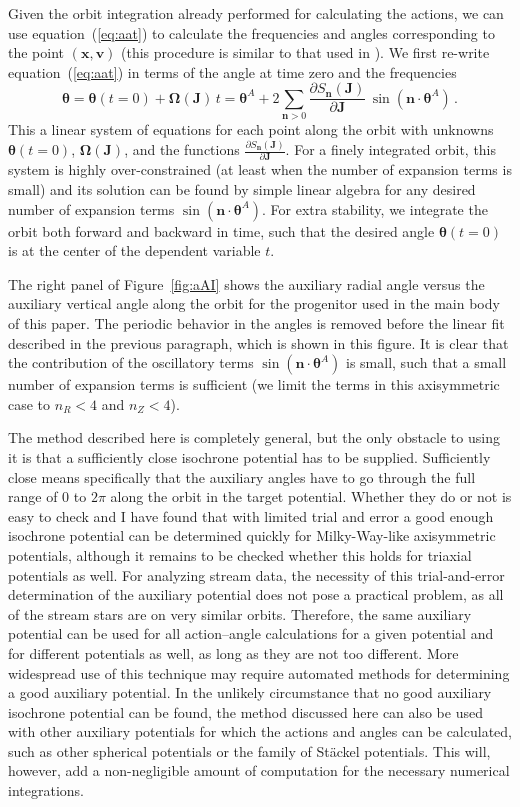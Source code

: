 \documentclass[12pt,preprint]{aastex}
\newcommand{\eqnname}{equation}
\newcommand{\equationname}{\eqnname}
\renewcommand{\figurename}{Figure}
\renewcommand{\vec}[1]{\ensuremath{\mathbf{#1}}}
\newcommand{\vecx}{\ensuremath{\vec{x}}}
\newcommand{\vecv}{\ensuremath{\vec{v}}}
\newcommand{\vecj}{\ensuremath{\vec{J}}}
\newcommand{\vecn}{\ensuremath{\vec{n}}}
\newcommand{\veco}{\ensuremath{\vec{\Omega}}}
\newcommand{\veca}{\ensuremath{\boldsymbol\theta}}
\begin{document}
Given the orbit integration already performed for calculating the
actions, we can use \equationname~(\ref{eq:aat}) to calculate the
frequencies and angles corresponding to the point $(\vecx,\vecv)$
(this procedure is similar to that used in \citealt{McMillan08a}). We
first re-write \equationname~(\ref{eq:aat}) in terms of the angle at
time zero and the frequencies
\begin{equation}\label{eq:aat2}
  \veca = \veca(t=0) + \veco(\vecj) \,t = \veca^A +2\sum_{\vecn > 0} \frac{\partial S_{\vecn}(\vecj)}{\partial \vecj}\,\sin(\vecn\cdot\veca^A)\,.
\end{equation}
This a linear system of equations for each point along the orbit with
unknowns $\veca(t=0)$, $\veco(\vecj)$, and the functions
$\frac{\partial S_{\vecn}(\vecj)}{\partial \vecj}$. For a finely
integrated orbit, this system is highly over-constrained (at least
when the number of expansion terms is small) and its solution can be
found by simple linear algebra for any desired number of expansion
terms $\sin(\vecn\cdot\veca^A)$. For extra stability, we integrate the
orbit both forward and backward in time, such that the desired angle
$\veca(t=0)$ is at the center of the dependent variable $t$.

The right panel of \figurename~\ref{fig:aAI} shows the auxiliary
radial angle versus the auxiliary vertical angle along the orbit for
the progenitor used in the main body of this paper. The periodic
behavior in the angles is removed before the linear fit described in
the previous paragraph, which is shown in this figure. It is clear
that the contribution of the oscillatory terms
$\sin(\vecn\cdot\veca^A)$ is small, such that a small number of
expansion terms is sufficient (we limit the terms in this axisymmetric
case to $n_R < 4$ and $n_Z < 4$).

The method described here is completely general, but the only obstacle
to using it is that a sufficiently close isochrone potential has to be
supplied. Sufficiently close means specifically that the auxiliary
angles have to go through the full range of $0$ to $2\pi$ along the
orbit in the target potential. Whether they do or not is easy to check
and I have found that with limited trial and error a good enough
isochrone potential can be determined quickly for Milky-Way-like
axisymmetric potentials, although it remains to be checked whether
this holds for triaxial potentials as well. For analyzing stream data,
the necessity of this trial-and-error determination of the auxiliary
potential does not pose a practical problem, as all of the stream
stars are on very similar orbits. Therefore, the same auxiliary
potential can be used for all action--angle calculations for a given
potential and for different potentials as well, as long as they are
not too different. More widespread use of this technique may require
automated methods for determining a good auxiliary potential. In the
unlikely circumstance that no good auxiliary isochrone potential can
be found, the method discussed here can also be used with other
auxiliary potentials for which the actions and angles can be
calculated, such as other spherical potentials or the family of
St\"{a}ckel potentials. This will, however, add a non-negligible
amount of computation for the necessary numerical integrations.
\end{document}
